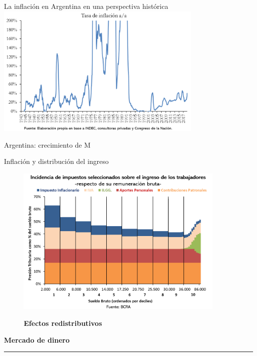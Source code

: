 \documentclass{beamer}
\begin{document}
\begin{frame}{La inflación en Argentina en una perspectiva histórica}
\centering\includegraphics[width=10cm]{Slides Principios de Economia/Figures/P59.png}\
\end{frame}

\begin{frame}{Argentina: crecimiento de M }

\end{frame}

\begin{frame}{Inflación y distribución del ingreso}
    \begin{figure} [H]   
\centering\includegraphics[width=0.9\textwidth]{Slides Principios de Economia/Figures/C33.10.png}\
\caption{\textbf{Efectos redistributivos}}
\end{figure}
\end{frame}


\begin{frame}{}
\centering\huge\textbf{Mercado de dinero} 
\vspace{2mm}
\hrule
\end{frame}
\end{document}
